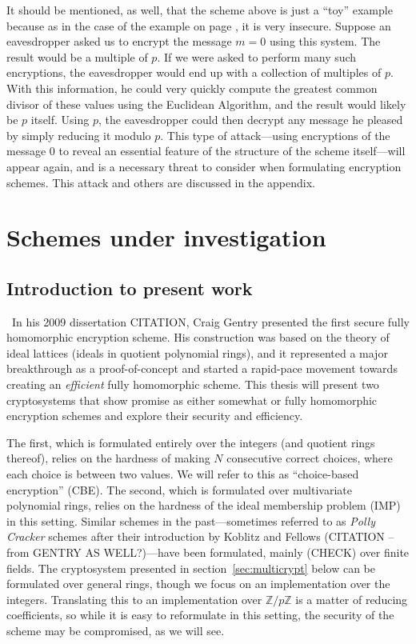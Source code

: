 \documentclass[11pt]{report}
\newcommand{\Z}{\mathbb{Z}}
\begin{document}
It should be mentioned, as well, that the scheme above is just a ``toy'' example because as in the case of the example on page \pageref{Example1}, it is very insecure. Suppose an eavesdropper asked us to encrypt the message $m=0$ using this system. The result would be a multiple of $p$. If we were asked to perform many such encryptions, the eavesdropper would end up with a collection of multiples of $p$. With this information, he could very quickly compute the greatest common divisor of these values using the Euclidean Algorithm, and the result would likely be $p$ itself. Using $p$, the eavesdropper could then decrypt any message he pleased by simply reducing it modulo $p$. This type of attack---using encryptions of the message $0$ to reveal an essential feature of the structure of the scheme itself---will appear again, and is a necessary threat to consider when formulating encryption schemes. This attack and others are discussed in the appendix.

\chapter{Schemes under investigation}

\section{Introduction to present work}

\
In his 2009 dissertation CITATION, Craig Gentry presented the first secure fully homomorphic encryption scheme. His construction was based on the theory of ideal lattices (ideals in quotient polynomial rings), and it represented a major breakthrough as a proof-of-concept and started a rapid-pace movement towards creating an \emph{efficient} fully homomorphic scheme. This thesis will present two cryptosystems that show promise as either somewhat or fully homomorphic encryption schemes and explore their security and efficiency.

The first, which is formulated entirely over the integers (and quotient rings thereof), relies on the hardness of making $N$ consecutive correct choices, where each choice
is between two values. We will refer to this as ``choice-based encryption'' (CBE). The second, which is formulated over multivariate polynomial rings, relies on the hardness of the ideal membership problem (IMP) in this
setting. Similar schemes in the past---sometimes referred to as \emph{Polly Cracker} schemes after their introduction by Koblitz and Fellows (CITATION -- from GENTRY AS WELL?)---have been formulated, mainly (CHECK) over finite fields. The cryptosystem presented in section~\ref{sec:multicrypt}  below can be formulated over general rings, though we focus on an implementation over the integers. Translating this to an implementation over $\Z/p\Z$ is a matter of reducing coefficients, so while it is easy to reformulate in this setting, the security of the scheme may be compromised, as we will see.
\end{document}
